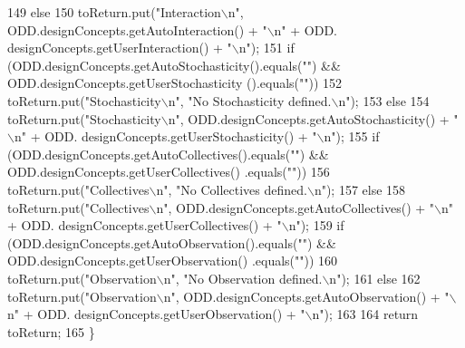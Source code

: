 \begin{DoxyCode}
149         \textcolor{keywordflow}{else}
150             toReturn.put(\textcolor{stringliteral}{"Interaction\(\backslash\)n"}, ODD.designConcepts.getAutoInteraction() + \textcolor{stringliteral}{"\(\backslash\)n"} + ODD.
      designConcepts.getUserInteraction() + \textcolor{stringliteral}{"\(\backslash\)n"});
151         \textcolor{keywordflow}{if} (ODD.designConcepts.getAutoStochasticity().equals(\textcolor{stringliteral}{""}) && ODD.designConcepts.getUserStochasticity
      ().equals(\textcolor{stringliteral}{""}))
152             toReturn.put(\textcolor{stringliteral}{"Stochasticity\(\backslash\)n"}, \textcolor{stringliteral}{"No Stochasticity defined.\(\backslash\)n"});
153         \textcolor{keywordflow}{else}
154             toReturn.put(\textcolor{stringliteral}{"Stochasticity\(\backslash\)n"}, ODD.designConcepts.getAutoStochasticity() + \textcolor{stringliteral}{"\(\backslash\)n"} + ODD.
      designConcepts.getUserStochasticity() + \textcolor{stringliteral}{"\(\backslash\)n"});
155         \textcolor{keywordflow}{if} (ODD.designConcepts.getAutoCollectives().equals(\textcolor{stringliteral}{""}) && ODD.designConcepts.getUserCollectives()
      .equals(\textcolor{stringliteral}{""}))
156             toReturn.put(\textcolor{stringliteral}{"Collectives\(\backslash\)n"}, \textcolor{stringliteral}{"No Collectives defined.\(\backslash\)n"});
157         \textcolor{keywordflow}{else}
158             toReturn.put(\textcolor{stringliteral}{"Collectives\(\backslash\)n"}, ODD.designConcepts.getAutoCollectives() + \textcolor{stringliteral}{"\(\backslash\)n"} + ODD.
      designConcepts.getUserCollectives() + \textcolor{stringliteral}{"\(\backslash\)n"});
159         \textcolor{keywordflow}{if} (ODD.designConcepts.getAutoObservation().equals(\textcolor{stringliteral}{""}) && ODD.designConcepts.getUserObservation()
      .equals(\textcolor{stringliteral}{""}))
160             toReturn.put(\textcolor{stringliteral}{"Observation\(\backslash\)n"}, \textcolor{stringliteral}{"No Observation defined.\(\backslash\)n"});
161         \textcolor{keywordflow}{else}
162             toReturn.put(\textcolor{stringliteral}{"Observation\(\backslash\)n"}, ODD.designConcepts.getAutoObservation() + \textcolor{stringliteral}{"\(\backslash\)n"} + ODD.
      designConcepts.getUserObservation() + \textcolor{stringliteral}{"\(\backslash\)n"});
163         
164         \textcolor{keywordflow}{return} toReturn;
165     \}
\end{DoxyCode}


